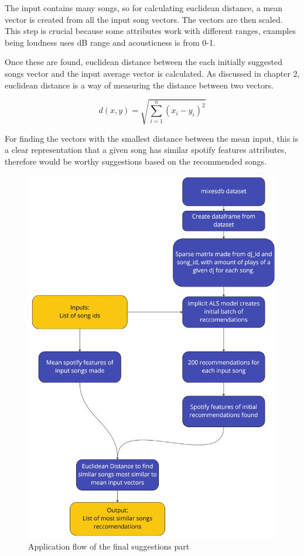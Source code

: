 The input contains many songs, so for calculating euclidean distance, a mean vector is created from all the input song vectors. The vectors are then scaled. This step is crucial because some attributes work with different ranges, examples being loudness uses dB range and acousticness is from 0-1.

Once these are found, euclidean distance between the each initially suggested songs vector and the input average vector is calculated. As discussed in chapter 2, euclidean distance is a way of measuring the distance between two vectors.

\begin{equation}
	d(x,y) = \sqrt{\sum _{i=1} ^{n}(x_{i} - y_{i})^{2}}
\end{equation}

For finding the vectors with the smallest distance between the mean input, this is a clear representation that a given song has similar spotify features attributes, therefore would be worthy suggestions based on the recommended songs.

\begin{figure}[H]
	\includegraphics[scale=0.1]{images/application_app_flow}
	\centering
	\caption{Application flow of the final suggestions part} 
\end{figure}

